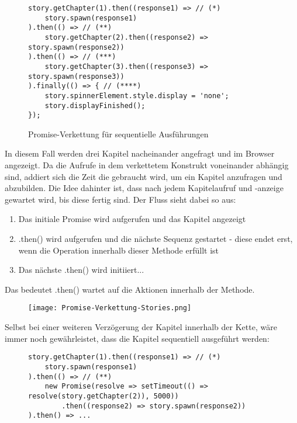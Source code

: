 \begin{figure}[H]
\begin{lstlisting}[basicstyle=\small]
story.getChapter(1).then((response1) => // (*)
    story.spawn(response1)
).then(() => // (**)
    story.getChapter(2).then((response2) => story.spawn(response2))
).then(() => // (***)
    story.getChapter(3).then((response3) => story.spawn(response3))
).finally(() => { // (****)
    story.spinnerElement.style.display = 'none';
    story.displayFinished();
});
\end{lstlisting}
\caption{Promise-Verkettung für sequentielle Ausführungen}
\end{figure}

\noindent
In diesem Fall werden drei Kapitel nacheinander angefragt und im Browser angezeigt. Da die Aufrufe in dem verkettetem Konstrukt voneinander abhängig sind, addiert sich die Zeit die gebraucht wird, um ein Kapitel anzufragen und abzubilden. Die Idee dahinter ist, dass nach jedem Kapitelaufruf und -anzeige gewartet wird, bis diese fertig sind. Der Fluss sieht dabei so aus:

\begin{enumerate}
    \item Das initiale Promise wird aufgerufen und das Kapitel angezeigt
    \item .then() wird aufgerufen und die nächste Sequenz gestartet - diese endet erst, wenn die Operation innerhalb dieser Methode erfüllt ist
    \item Das nächste .then() wird initiiert...
\end{enumerate}

Das bedeutet .then() wartet auf die Aktionen innerhalb der Methode.

\begin{figure}[H]
\centering
\texttt{[image: Promise-Verkettung-Stories.png]}
\end{figure}

\noindent
Selbst bei einer weiteren Verzögerung der Kapitel innerhalb der Kette, wäre immer noch gewährleistet, dass die Kapitel sequentiell ausgeführt werden:

\begin{figure}[H]
\begin{lstlisting}[basicstyle=\small]
story.getChapter(1).then((response1) => // (*)
    story.spawn(response1)
).then(() => // (**)
    new Promise(resolve => setTimeout(() => resolve(story.getChapter(2)), 5000))
        .then((response2) => story.spawn(response2))
).then() => ...
\end{lstlisting}
\end{figure}

